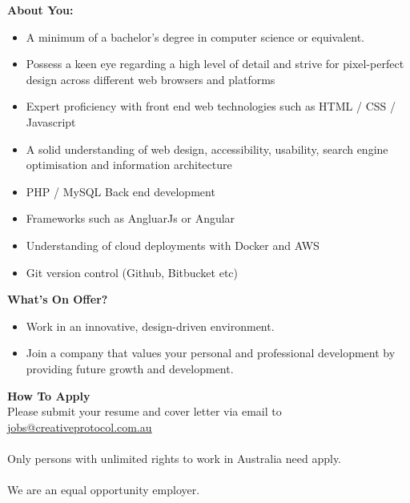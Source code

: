 \documentclass[11pt, oneside, a4paper, titlepage]{article}
\begin{document}
\hfill \break
\textbf{About You:}
\begin{itemize}
    	\item A minimum of a bachelor's degree in computer science or equivalent. 
    	\item Possess a keen eye regarding a high level of detail and strive for pixel-perfect design across different web browsers and platforms 
    	\item Expert proficiency with front end web technologies such as HTML / CSS / Javascript 
    	\item A solid understanding of web design, accessibility, usability, search engine optimisation and information architecture 
    	\item PHP / MySQL Back end development 
    	\item Frameworks such as AngluarJs or Angular 
    	\item Understanding of cloud deployments with Docker and AWS 
    	\item Git version control (Github, Bitbucket etc) 
\end{itemize}
\hfill \break
\textbf{What's On Offer?}
\begin{itemize}
    	\item Work in an innovative, design-driven environment. 
    	\item Join a company that values your personal and professional development by providing future growth and development. 
\end{itemize}
\hfill \break
\textbf{How To Apply}
\\
Please submit your resume and cover letter via email to \href{mailto:jobs@creativeprotocol.com.au}{jobs@creativeprotocol.com.au}
\\
\\
Only persons with unlimited rights to work in Australia need apply. 
\\
\\
We are an equal opportunity employer. 
\newpage
\end{document}

